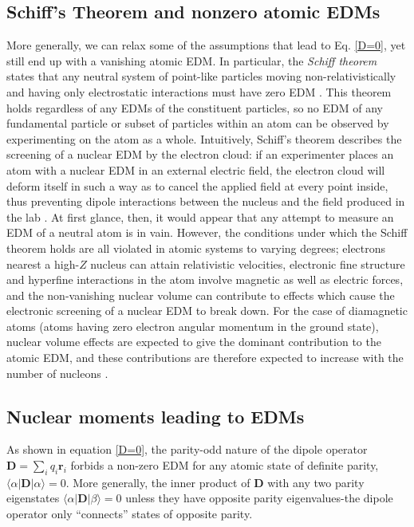 \documentclass [10pt, twoside] {uwthesis}[2012/04/02]
\begin{document}
\subsection{Schiff's Theorem and nonzero atomic EDMs} \label{Schiff_Moment}
More generally, we can relax some of the assumptions that lead to Eq. \eqref{D=0}, yet still end up with a vanishing atomic EDM. In particular, the \textit{Schiff theorem} states that any neutral system of point-like particles moving non-relativistically and having only electrostatic interactions must have zero EDM \cite{1963_Schiff}. This theorem holds regardless of any EDMs of the constituent particles, so no EDM of any fundamental particle or subset of particles within an atom can be observed by experimenting on the atom as a whole. Intuitively, Schiff's theorem describes the screening of a nuclear EDM by the electron cloud: if an experimenter places an atom with a nuclear EDM in an external electric field, the electron cloud will deform itself in such a way as to cancel the applied field at every point inside, thus preventing dipole interactions between the nucleus and the field produced in the lab \cite[Sec. 6.1]{Khriplovich_Lamoreaux}. At first glance, then, it would appear that any attempt to measure an EDM of a neutral atom is in vain. However, the conditions under which the Schiff theorem holds are all violated in atomic systems to varying degrees; electrons nearest a high-$Z$ nucleus can attain relativistic velocities, electronic fine structure and hyperfine interactions in the atom involve magnetic as well as electric forces, and the non-vanishing nuclear volume can contribute to effects which cause the electronic screening of a nuclear EDM to break down. For the case of diamagnetic atoms (atoms having zero electron angular momentum in the ground state), nuclear volume effects are expected to give the dominant contribution to the atomic EDM, and these contributions are therefore expected to increase with the number of nucleons \cite{2007_Liu_et._al._Schiff_Theorem_and_Corrections}.

\subsection{Nuclear moments leading to EDMs}
As shown in equation \eqref{D=0}, the parity-odd nature of the dipole operator $\mathbf{D} = \sum_{i}q_i\mathbf{r}_i$ forbids a non-zero EDM for any atomic state of definite parity, $\langle\alpha\vert\mathbf{D}\vert\alpha\rangle=0$. More generally, the inner product of $\mathbf{D}$ with any two parity eigenstates $\langle\alpha\vert\mathbf{D}\vert\beta\rangle=0$ unless they have opposite parity eigenvalues-the dipole operator only ``connects'' states of opposite parity. 
\end{document}
